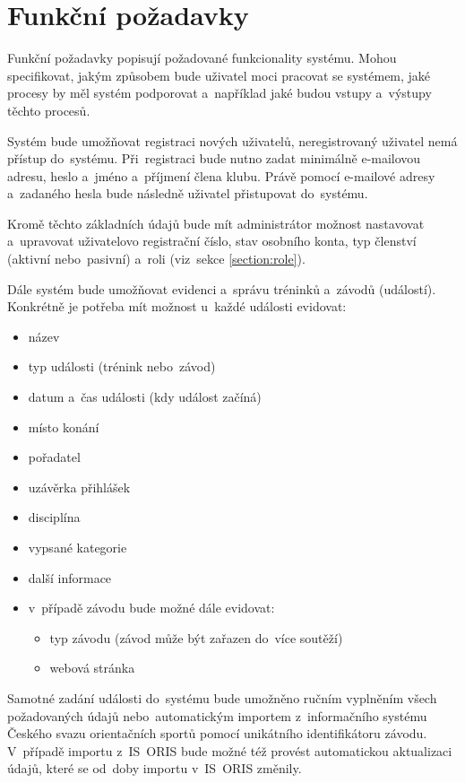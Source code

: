 \section{Funkční požadavky}
Funkční požadavky popisují požadované funkcionality systému. Mohou specifikovat, jakým způsobem bude uživatel moci pracovat se systémem, jaké procesy by měl systém podporovat a~například jaké budou vstupy a~výstupy těchto procesů. \cite{requirements}

\begin{enumerate}[label=\textcolor{decoration}{\textbf{F\arabic*}}]
	Systém bude umožňovat registraci nových uživatelů, neregistrovaný uživatel nemá přístup do~systému. Při~registraci bude nutno zadat minimálně e-mailovou adresu, heslo a~jméno a~příjmení člena klubu. Právě pomocí e-mailové adresy a~zadaného hesla bude následně uživatel přistupovat do~systému.

	Kromě těchto základních údajů bude mít administrátor možnost nastavovat a~upravovat uživatelovo registrační číslo, stav osobního konta, typ členství (aktivní nebo~pasivní) a~roli (viz~sekce \ref{section:role}).

	Dále systém bude umožňovat evidenci a~správu tréninků a~závodů (událostí). Konkrétně je potřeba mít možnost u~každé události evidovat:
	\begin{itemize}
		\item název
		\item typ události (trénink nebo~závod)
		\item datum a~čas události (kdy událost začíná)
		\item místo konání
		\item pořadatel
		\item uzávěrka přihlášek
		\item disciplína
		\item vypsané kategorie
		\item další informace
		\item v~případě závodu bude možné dále evidovat:
		\begin{itemize}
			\item typ závodu (závod může být zařazen do~více soutěží)
			\item webová stránka
		\end{itemize}
	\end{itemize}

	Samotné zadání události do~systému bude umožněno ručním vyplněním všech požadovaných údajů nebo~automatickým importem z~informačního systému Českého svazu orientačních sportů pomocí unikátního identifikátoru závodu. V~případě importu z~IS~ORIS bude možné též provést automatickou aktualizaci údajů, které se od~doby importu v~IS~ORIS změnily.


\end{enumerate}
